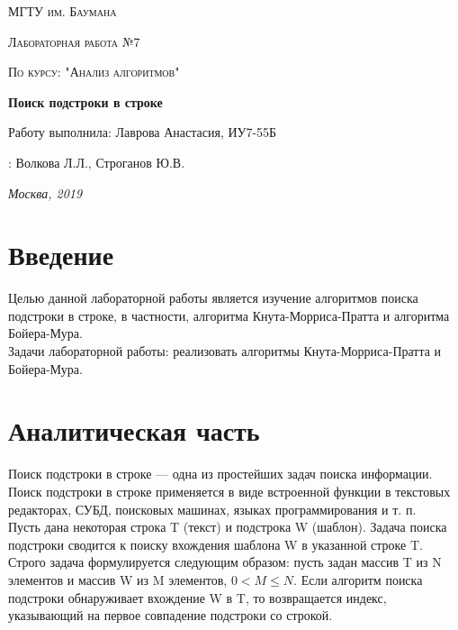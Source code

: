 \documentclass[12pt]{report}
\begin{document}
\begin{titlepage}
	\centering
	{\scshape\LARGE МГТУ им. Баумана \par}
	\vspace{3cm}
	{\scshape\Large Лабораторная работа №7\par}
	\vspace{0.5cm}	
	{\scshape\Large По курсу: "Анализ алгоритмов"\par}
	\vspace{1.5cm}
	{\huge\bfseries Поиск подстроки в строке\par}
	\vspace{2cm}
	\Large Работу выполнила: Лаврова Анастасия, ИУ7-55Б\par
	\vspace{0.5cm}
	:  Волкова Л.Л., Строганов Ю.В.\par

	\vfill
	\large \textit {Москва, 2019} \par
\end{titlepage}

\tableofcontents

\newpage
\chapter*{Введение}
Целью данной лабораторной работы является изучение алгоритмов поиска подстроки в строке, в частности, алгоритма Кнута-Морриса-Пратта и алгоритма Бойера-Мура.\\
 Задачи лабораторной работы: реализовать алгоритмы Кнута-Морриса-Пратта и Бойера-Мура.


\chapter{Аналитическая часть}
Поиск подстроки в строке — одна из простейших задач поиска информации. Поиск подстроки в строке применяется в виде встроенной функции в текстовых редакторах, СУБД, поисковых машинах, языках программирования и т. п.\\

Пусть дана некоторая строка T (текст) и подстрока W (шаблон). Задача поиска подстроки сводится к поиску вхождения шаблона W в указанной строке T. Строго задача формулируется следующим образом: пусть задан массив T из N элементов и массив W из M элементов, $0 < M \leqslant N$. Если алгоритм поиска подстроки обнаруживает вхождение W в T, то возвращается индекс, указывающий на первое совпадение подстроки со строкой.
\end{document}
